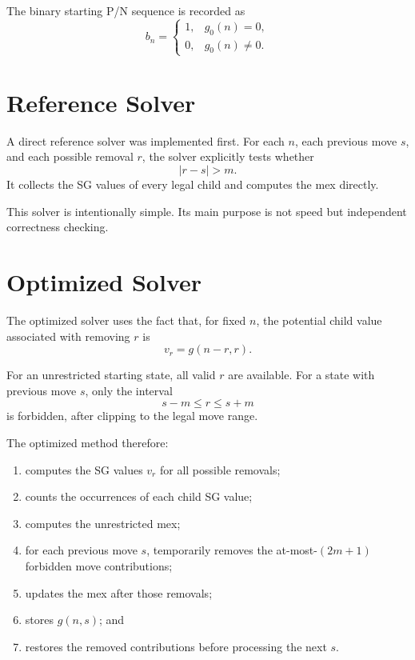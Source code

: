 \documentclass[11pt]{article}
\begin{document}
The binary starting P/N sequence is recorded as
\begin{equation}
    b_n=
    \begin{cases}
        1, & g_0(n)=0,\\
        0, & g_0(n)\ne0.
    \end{cases}
\end{equation}

\section{Reference Solver}

A direct reference solver was implemented first. For each $n$, each previous move $s$, and each possible removal $r$, the solver explicitly tests whether
\begin{equation}
    |r-s|>m.
\end{equation}
It collects the SG values of every legal child and computes the mex directly.

This solver is intentionally simple. Its main purpose is not speed but independent correctness checking.

\section{Optimized Solver}

The optimized solver uses the fact that, for fixed $n$, the potential child value associated with removing $r$ is
\begin{equation}
    v_r=g(n-r,r).
\end{equation}

For an unrestricted starting state, all valid $r$ are available. For a state with previous move $s$, only the interval
\begin{equation}
    s-m\le r\le s+m
\end{equation}
is forbidden, after clipping to the legal move range.

The optimized method therefore:
\begin{enumerate}
    \item computes the SG values $v_r$ for all possible removals;
    \item counts the occurrences of each child SG value;
    \item computes the unrestricted mex;
    \item for each previous move $s$, temporarily removes the at-most-$(2m+1)$ forbidden move contributions;
    \item updates the mex after those removals;
    \item stores $g(n,s)$; and
    \item restores the removed contributions before processing the next $s$.
\end{enumerate}
\end{document}
